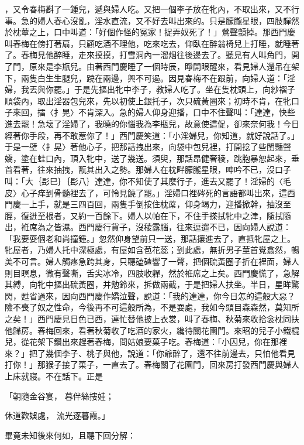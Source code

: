 ，又令春梅斟了一鍾兒，遞與婦人吃。又把一個李子放在牝內，不取出來，又不行事。急的婦人春心沒亂，淫水直流，又不好去叫出來的。只是朦朧星眼，四肢軃然於枕蕈之上，口中叫道：「好個作怪的冤家！捉弄奴死了！」鶯聲顫掉。那西門慶叫春梅在傍打著扇，只顧吃酒不理他，吃來吃去，仰臥在醉翁椅兒上打睡，就睡著了。春梅見他醉睡，走來摸摸，打雪洞內一溜烟往後邊去了。聽見有人叫角門，開了門，原來是李瓶兒。由著西門慶睡了一個時辰，睜開眼醒來，看見婦人還吊在架下，兩隻白生生腿兒，蹺在兩邊，興不可遏。因見春梅不在跟前，向婦人道：「淫婦，我丟與你罷。」于是先摳出牝中李子，教婦人吃了。坐在隻枕頭上，向紗褶子順袋內，取出淫器包兒來，先以初使上銀托子，次只硫黃圈來；初時不肯，在牝口子來回，擂〈扌晃〉不肯深入。急的婦人仰身迎播，口中不住聲叫：「達達，快些進去罷！急壞了淫婦了，我曉的你惱我為李瓶兒，故意使這促，卻來奈何我！今日經著你手段，再不敢惹你了！」西門慶笑道：「小淫婦兒，你知道，就好說話了。」于是一壁〈扌晃〉著他心子，把那話拽出來，向袋中包兒裡，打開捻了些閨豔聲嬌，塗在蛙口內，頂入牝中，送了幾送。須臾，那話昂健奢稜，跳胞暴恕起來，垂首看著，往來抽拽，翫其出入之勢。那婦人在枕畔朦朧星眼，呻吟不已，沒口子叫：「大｛髟巳｝｛髟八｝達達，你不知使了其麼行子，進去又罷了！淫婦的〈毛皮〉心子痒到骨髓裡去了，可怜見饒了罷。」淫婦口裡硶死的言語都叫出來，這西門慶一上手，就是三四百回，兩隻手倒按住枕蓆，仰身竭力，迎播掀幹，抽沒至脛，復迸至根者，又約一百餘下。婦人以帕在下，不住手搽拭牝中之津，隨拭隨出，袵席為之皆濕。西門慶行貨子，沒稜露腦，往來逗遛不已，因向婦人說道：「我要耍個老和尚撞鍾。」忽然仰身望前只一送，那話攘進去了，直抵牝屋之上。牝屋者，乃婦人托中深極處，有屋如含苞花蕊；到此處，無折男子莖首覺翕然，暢美不可言。婦人觸疼急跨其身，只聽磕碴響了一聲，把個硫黃圈子折在裡面，婦人則目瞑息，微有聲嘶，舌尖冰冷，四肢收軃，然於袵席之上矣。西門慶慌了，急解其縛，向牝中摳出硫黃圈，并勉鈴來，拆做兩截，于是把婦人扶坐。半日，星眸驚閃，甦省過來，因向西門慶作嬌泣聲，說道：「我的達達，你今日怎的這般大惡？險不喪了奴之性命，今後再不可這般所為，不是耍處，我如今頭目森森然，莫知所之矣！」西門慶見日色已西，連忙替他披上衣裳，叫了春梅、秋菊來收拾衾枕同扶他歸房。春梅回來，看著秋菊收了吃酒的家火，纔待關花園門。來昭的兒子小鐵棍兒，從花架下鑽出來趕著春梅，問姑娘要菓子吃。春梅道：「小囚兒，你在那裡來？」把了幾個李子、桃子與他，說道：「你爺醉了，還不往前邊去，只怕他看見打你！」那猴子接了菓子，一直去了。春梅關了花園門，回來房打發西門慶與婦人上床就寢。不在話下。正是

「朝隨金谷宴，  暮伴絲摟娃；

休道歡娛處，  流光逐暮霞。」

畢竟未知後來何如，且聽下回分解：

